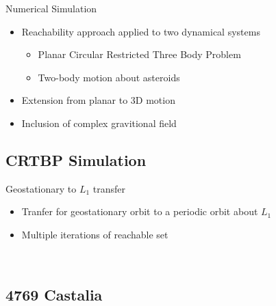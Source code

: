 \documentclass[11pt,professionalfonts]{beamer}
\begin{document}
\begin{frame}{Numerical Simulation}
\begin{itemize}
    \item Reachability approach applied to two dynamical systems
    \begin{itemize}
        \item Planar Circular Restricted Three Body Problem
        \item Two-body motion about asteroids
    \end{itemize}
    \item Extension from planar to 3D motion 
    \item Inclusion of complex gravitional field
\end{itemize}

\end{frame}

\subsection{CRTBP Simulation}

\begin{frame}{Geostationary to \( L_1 \) transfer} %
\begin{itemize}
       \item Tranfer for geostationary orbit to a periodic orbit about \( L_1\)
       \item Multiple iterations of reachable set
\end{itemize}

\begin{figure}
       \centering
       \begin{subfigure}[htbp]{0.5\textwidth}
       \end{subfigure}~
       \begin{subfigure}[htbp]{0.5\textwidth}
       \end{subfigure}
       \end{figure}

\end{frame} %

\subsection{4769 Castalia}
\end{document}
